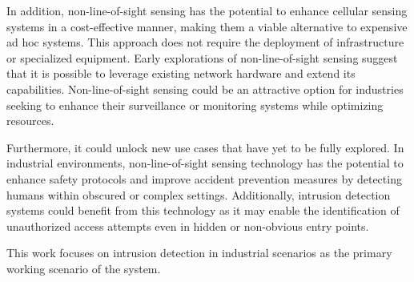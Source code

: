 	In addition, non-line-of-sight sensing has the potential to enhance cellular sensing systems in a cost-effective manner, making them a viable alternative to expensive ad hoc systems. This approach does not require the deployment of infrastructure or specialized equipment. Early explorations of non-line-of-sight sensing suggest that it is possible to leverage existing network hardware and extend its capabilities. Non-line-of-sight sensing could be an attractive option for industries seeking to enhance their surveillance or monitoring systems while optimizing resources.
	
	Furthermore, it could unlock new use cases that have yet to be fully explored. In industrial environments, non-line-of-sight sensing technology has the potential to enhance safety protocols and improve accident prevention measures by detecting humans within obscured or complex settings. Additionally, intrusion detection systems could benefit from this technology as it may enable the identification of unauthorized access attempts even in hidden or non-obvious entry points.
	
	This work focuses on intrusion detection in industrial scenarios as the primary working scenario of the system. 
	
	

